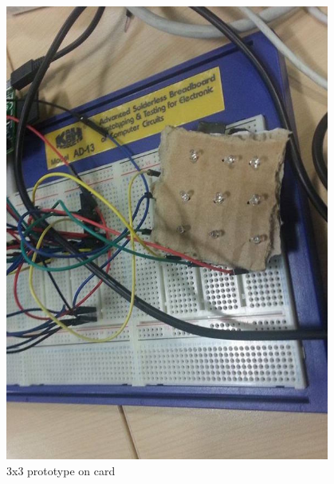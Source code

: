 \documentclass{beamer}
\begin{document}
\begin{frame}
\begin{columns}
\begin{column}{0.4\textwidth}
\begin{figure}
	\includegraphics[scale=0.181]{images/cardboard_matrix.jpg}
	\caption{3x3 prototype on card}
\end{figure}
\end{column}

\begin{column}{0.05\textwidth}
\end{column}

\end{columns}

\end{frame}

\end{document}
